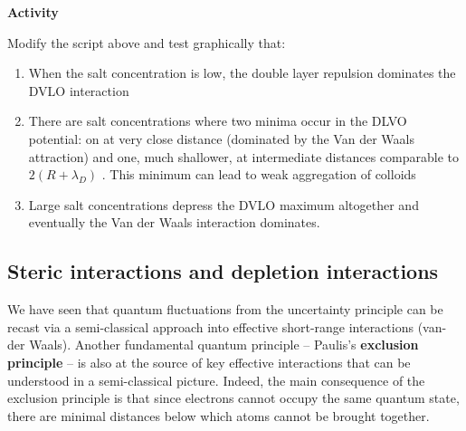 \documentclass[
  letterpaper,
  enabledeprecatedfontcommands]{report}
\providecommand{\tightlist}{%
  \setlength{\itemsep}{0pt}\setlength{\parskip}{0pt}}
\begin{document}
\begin{tcolorbox}[enhanced jigsaw, breakable, colframe=quarto-callout-important-color-frame, colback=white, arc=.35mm, left=2mm, leftrule=.75mm, bottomrule=.15mm, rightrule=.15mm, toprule=.15mm, opacityback=0]
\begin{minipage}[t]{5.5mm}
\textcolor{quarto-callout-important-color}{\faExclamation}
\end{minipage}%
\begin{minipage}[t]{\textwidth - 5.5mm}

\vspace{-3mm}\textbf{Activity}\vspace{3mm}

Modify the script above and test graphically that:

\begin{enumerate}
\def\labelenumi{\arabic{enumi}.}
\tightlist
\item
  When the salt concentration is low, the double layer repulsion
  dominates the DVLO interaction
\item
  There are salt concentrations where two minima occur in the DLVO
  potential: on at very close distance (dominated by the Van der Waals
  attraction) and one, much shallower, at intermediate distances
  comparable to \(2(R+\lambda_D)\) . This minimum can lead to weak
  aggregation of colloids
\item
  Large salt concentrations depress the DVLO maximum altogether and
  eventually the Van der Waals interaction dominates.
\end{enumerate}

\end{minipage}%
\end{tcolorbox}

\subsection{Steric interactions and depletion
interactions}\label{steric-interactions-and-depletion-interactions}

We have seen that quantum fluctuations from the uncertainty principle
can be recast via a semi-classical approach into effective short-range
interactions (van-der Waals). Another fundamental quantum principle --
Paulis's \textbf{exclusion principle} -- is also at the source of key
effective interactions that can be understood in a semi-classical
picture. Indeed, the main consequence of the exclusion principle is that
since electrons cannot occupy the same quantum state, there are minimal
distances below which atoms cannot be brought together.
\end{document}
